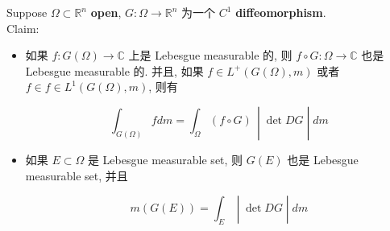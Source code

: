 \begin{theorem}{}

Suppose \(\Omega \subset \mathbb{R}^{n}\) \textbf{open}, \(G:\Omega\rightarrow\mathbb{R}^{n}\) 为一个 \(C^{1}\) \textbf{diffeomorphism}.\\
Claim:

\begin{itemize}
\item
  如果 \(f:G(\Omega)\rightarrow\mathbb{C}\) 上是 Lebesgue measurable 的, 则 \(f \circ G:\Omega\rightarrow\mathbb{C}\) 也是 Lebesgue measurable 的. 并且, 如果 \(f \in L^{+}(G(\Omega),m)\) 或者 \(f \in f \in L^{1}(G(\Omega),m)\), 则有

  \[\left. \int_{G(\Omega)}f dm = \int_{\Omega}(f \circ G)\, \middle| \det DG \middle| dm \right.\]
\item
  如果 \(E \subset \Omega\) 是 Lebesgue measurable set, 则 \(G(E)\) 也是 Lebesgue measurable set, 并且

  \[\left. m(G(E)) = \int_{E} \middle| \det DG \middle| dm \right.\]
\end{itemize}

\end{theorem}

